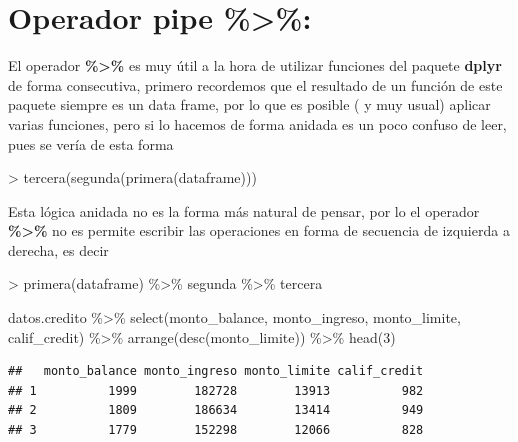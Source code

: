 \documentclass[
  12pt,
]{book}
\newenvironment{Shaded}{\begin{snugshade}}{\end{snugshade}}
\newcommand{\DecValTok}[1]{\textcolor[rgb]{0.00,0.00,0.81}{#1}}
\newcommand{\FunctionTok}[1]{\textcolor[rgb]{0.00,0.00,0.00}{#1}}
\newcommand{\NormalTok}[1]{#1}
\newcommand{\SpecialCharTok}[1]{\textcolor[rgb]{0.00,0.00,0.00}{#1}}
\begin{document}
\hypertarget{operador-pipe}{%
\section{\texorpdfstring{\textbf{Operador pipe \%\textgreater\%}:}{Operador pipe \%\textgreater\%:}}\label{operador-pipe}}

El operador \textbf{\%\textgreater\%} es muy útil a la hora de utilizar funciones del paquete \textbf{dplyr} de forma consecutiva, primero recordemos que el resultado de un función de este paquete siempre es un data frame, por lo que es posible ( y muy usual) aplicar varias funciones, pero si lo hacemos de forma anidada es un poco confuso de leer, pues se vería de esta forma

\begin{Shaded}
\begin{Highlighting}[]
\SpecialCharTok{\textgreater{}} \FunctionTok{tercera}\NormalTok{(}\FunctionTok{segunda}\NormalTok{(}\FunctionTok{primera}\NormalTok{(dataframe)))}
\end{Highlighting}
\end{Shaded}

Esta lógica anidada no es la forma más natural de pensar, por lo el operador \textbf{\%\textgreater\%} no es permite escribir las operaciones en forma de secuencia de izquierda a derecha, es decir

\begin{Shaded}
\begin{Highlighting}[]
\SpecialCharTok{\textgreater{}} \FunctionTok{primera}\NormalTok{(dataframe) }\SpecialCharTok{\%\textgreater{}\%}\NormalTok{ segunda }\SpecialCharTok{\%\textgreater{}\%}\NormalTok{ tercera}
\end{Highlighting}
\end{Shaded}

\begin{Shaded}
\begin{Highlighting}[]
\NormalTok{datos.credito }\SpecialCharTok{\%\textgreater{}\%} \FunctionTok{select}\NormalTok{(monto\_balance, monto\_ingreso, monto\_limite, calif\_credit)  }\SpecialCharTok{\%\textgreater{}\%} \FunctionTok{arrange}\NormalTok{(}\FunctionTok{desc}\NormalTok{(monto\_limite)) }\SpecialCharTok{\%\textgreater{}\%} \FunctionTok{head}\NormalTok{(}\DecValTok{3}\NormalTok{)}
\end{Highlighting}
\end{Shaded}

\begin{verbatim}
##   monto_balance monto_ingreso monto_limite calif_credit
## 1          1999        182728        13913          982
## 2          1809        186634        13414          949
## 3          1779        152298        12066          828
\end{verbatim}
\end{document}

